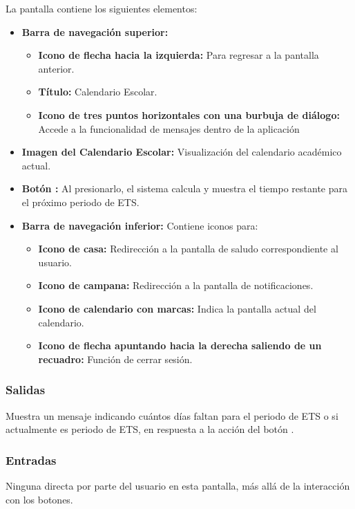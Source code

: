 La pantalla contiene los siguientes elementos:
\begin{itemize}
	\item \textbf{Barra de navegación superior:}
	\begin{itemize}
		\item \textbf{Icono de flecha hacia la izquierda:} Para regresar a la pantalla anterior.
		\item \textbf{Título:} Calendario Escolar.
		\item \textbf{Icono de tres puntos horizontales con una burbuja de diálogo:} Accede a la funcionalidad de mensajes dentro de la aplicación
	\end{itemize}
	\item \textbf{Imagen del Calendario Escolar:} Visualización del calendario académico actual.
	\item \textbf{Botón :} Al presionarlo, el sistema calcula y muestra el tiempo restante para el próximo periodo de ETS.
	\item \textbf{Barra de navegación inferior:} Contiene iconos para:
	\begin{itemize}
		\item \textbf{Icono de casa:} Redirección a la pantalla de saludo correspondiente al usuario.
		\item \textbf{Icono de campana:} Redirección a la pantalla de notificaciones.
		\item \textbf{Icono de calendario con marcas:} Indica la pantalla actual del calendario.
		\item \textbf{Icono de flecha apuntando hacia la derecha saliendo de un recuadro:} Función de cerrar sesión.
	\end{itemize}
\end{itemize}

\subsubsection{Salidas}
Muestra un mensaje indicando cuántos días faltan para el periodo de ETS o si actualmente es periodo de ETS, en respuesta a la acción del botón .

\subsubsection{Entradas}
Ninguna directa por parte del usuario en esta pantalla, más allá de la interacción con los botones.

